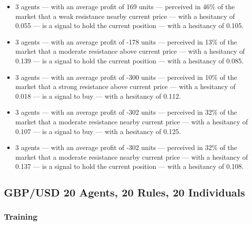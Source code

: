 {\scriptsize
  \begin{itemize}
    \item 3 agents — with an average profit of 169 units — perceived in 46\% of
      the market that a weak resistance nearby current price — with a hesitancy
      of 0.055 — is a signal to hold the current position — with a hesitancy of
      0.105.
\item 3 agents — with an average profit of -178 units — perceived in 13\% of the
  market that a moderate resistance above current price — with a hesitancy of
  0.139 — is a signal to hold the current position — with a hesitancy of 0.085.
\item 3 agents — with an average profit of -300 units — perceived in 10\% of the
  market that a strong resistance above current price — with a hesitancy of
  0.018 — is a signal to buy — with a hesitancy of 0.112.
\item 3 agents — with an average profit of -302 units — perceived in 32\% of the
  market that a moderate resistance nearby current price — with a hesitancy of
  0.107 — is a signal to buy — with a hesitancy of 0.125.
\item 3 agents — with an average profit of -302 units — perceived in 32\% of the
  market that a moderate resistance nearby current price — with a hesitancy of
  0.137 — is a signal to hold the current position — with a hesitancy of 0.108.
  \end{itemize}
}

\subsection{GBP/USD 20 Agents, 20 Rules, 20 Individuals}
\label{}

\subsubsection{Training}
\label{}

